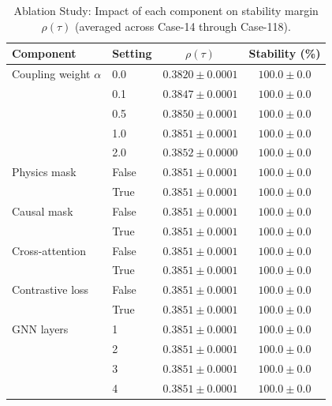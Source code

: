 \begin{table}[t]
\centering
\caption{Ablation Study: Impact of each component on stability margin $\rho(\tau)$ (averaged across Case-14 through Case-118).}
\label{tab:ablation}
\begin{tabular}{llcc}
\toprule
Component & Setting & $\rho(\tau)$ & Stability (\%) \\
\midrule
Coupling weight $\alpha$ & 0.0 & $0.3820 \pm 0.0001$ & $100.0 \pm 0.0$ \\
 & 0.1 & $0.3847 \pm 0.0001$ & $100.0 \pm 0.0$ \\
 & 0.5 & $0.3850 \pm 0.0001$ & $100.0 \pm 0.0$ \\
 & 1.0 & $0.3851 \pm 0.0001$ & $100.0 \pm 0.0$ \\
 & 2.0 & $0.3852 \pm 0.0000$ & $100.0 \pm 0.0$ \\
\midrule
Physics mask & False & $0.3851 \pm 0.0001$ & $100.0 \pm 0.0$ \\
 & True & $0.3851 \pm 0.0001$ & $100.0 \pm 0.0$ \\
\midrule
Causal mask & False & $0.3851 \pm 0.0001$ & $100.0 \pm 0.0$ \\
 & True & $0.3851 \pm 0.0001$ & $100.0 \pm 0.0$ \\
\midrule
Cross-attention & False & $0.3851 \pm 0.0001$ & $100.0 \pm 0.0$ \\
 & True & $0.3851 \pm 0.0001$ & $100.0 \pm 0.0$ \\
\midrule
Contrastive loss & False & $0.3851 \pm 0.0001$ & $100.0 \pm 0.0$ \\
 & True & $0.3851 \pm 0.0001$ & $100.0 \pm 0.0$ \\
\midrule
GNN layers & 1 & $0.3851 \pm 0.0001$ & $100.0 \pm 0.0$ \\
 & 2 & $0.3851 \pm 0.0001$ & $100.0 \pm 0.0$ \\
 & 3 & $0.3851 \pm 0.0001$ & $100.0 \pm 0.0$ \\
 & 4 & $0.3851 \pm 0.0001$ & $100.0 \pm 0.0$ \\
\bottomrule
\end{tabular}
\end{table}
